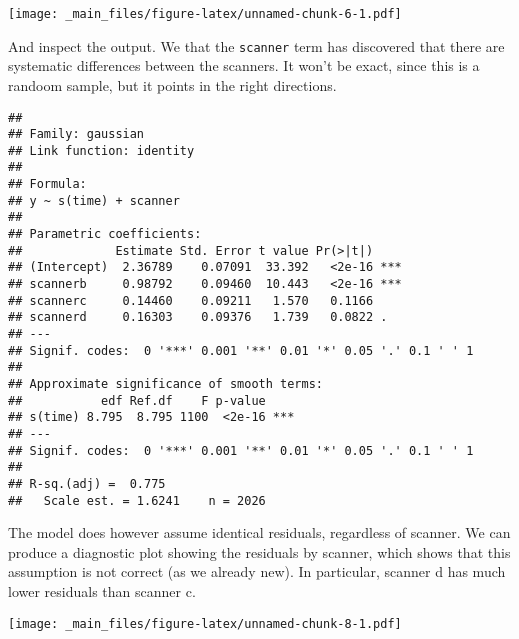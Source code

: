 \documentclass[
]{book}
\newenvironment{Shaded}{\begin{snugshade}}{\end{snugshade}}
\newcommand{\AttributeTok}[1]{\textcolor[rgb]{0.77,0.63,0.00}{#1}}
\newcommand{\FunctionTok}[1]{\textcolor[rgb]{0.00,0.00,0.00}{#1}}
\newcommand{\NormalTok}[1]{#1}
\newcommand{\SpecialCharTok}[1]{\textcolor[rgb]{0.00,0.00,0.00}{#1}}
\newcommand{\StringTok}[1]{\textcolor[rgb]{0.31,0.60,0.02}{#1}}
\begin{document}
\texttt{[image: \_main\_files/figure-latex/unnamed-chunk-6-1.pdf]}

And inspect the output. We that the \texttt{scanner} term has discovered that there are systematic differences between the scanners. It won't be exact, since this is a randoom sample, but it points in the right directions.

\begin{Shaded}
\end{Shaded}

\begin{verbatim}
## 
## Family: gaussian 
## Link function: identity 
## 
## Formula:
## y ~ s(time) + scanner
## 
## Parametric coefficients:
##             Estimate Std. Error t value Pr(>|t|)    
## (Intercept)  2.36789    0.07091  33.392   <2e-16 ***
## scannerb     0.98792    0.09460  10.443   <2e-16 ***
## scannerc     0.14460    0.09211   1.570   0.1166    
## scannerd     0.16303    0.09376   1.739   0.0822 .  
## ---
## Signif. codes:  0 '***' 0.001 '**' 0.01 '*' 0.05 '.' 0.1 ' ' 1
## 
## Approximate significance of smooth terms:
##           edf Ref.df    F p-value    
## s(time) 8.795  8.795 1100  <2e-16 ***
## ---
## Signif. codes:  0 '***' 0.001 '**' 0.01 '*' 0.05 '.' 0.1 ' ' 1
## 
## R-sq.(adj) =  0.775   
##   Scale est. = 1.6241    n = 2026
\end{verbatim}

The model does however assume identical residuals, regardless of scanner. We can produce a diagnostic plot showing the residuals by scanner, which shows that this assumption is not correct (as we already new). In particular, scanner d has much lower residuals than scanner c.

\begin{Shaded}
\end{Shaded}

\texttt{[image: \_main\_files/figure-latex/unnamed-chunk-8-1.pdf]}
\end{document}
